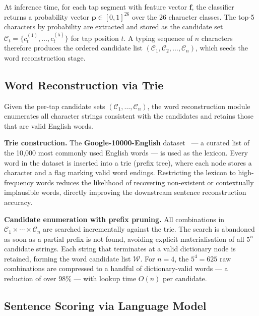 \documentclass[conference]{IEEEtran}
\begin{document}
At inference time, for each tap segment with feature vector
$\mathbf{f}$, the classifier returns a probability vector
$\mathbf{p} \in [0,1]^{26}$ over the 26 character classes.
The top-5 characters by probability are extracted and stored as the
candidate set $\mathcal{C}_t = \{c_t^{(1)}, \ldots, c_t^{(5)}\}$
for tap position $t$.
A typing sequence of $n$ characters therefore produces the ordered
candidate list
$(\mathcal{C}_1, \mathcal{C}_2, \ldots, \mathcal{C}_n)$,
which seeds the word reconstruction stage.

\subsection{Word Reconstruction via Trie}

Given the per-tap candidate sets
$(\mathcal{C}_1, \ldots, \mathcal{C}_n)$, the word reconstruction
module enumerates all character strings consistent with the
candidates and retains those that are valid English words.

\textbf{Trie construction.}
The \textbf{Google-10000-English} dataset~\cite{google10k} --- a
curated list of the 10,000 most commonly used English words --- is
used as the lexicon.
Every word in the dataset is inserted into a trie (prefix tree),
where each node stores a character and a flag marking valid word
endings.
Restricting the lexicon to high-frequency words reduces the
likelihood of recovering non-existent or contextually implausible
words, directly improving the downstream sentence reconstruction
accuracy.

\textbf{Candidate enumeration with prefix pruning.}
All combinations in
$\mathcal{C}_1 \times \cdots \times \mathcal{C}_n$
are searched incrementally against the trie.
The search is abandoned as soon as a partial prefix is not found,
avoiding explicit materialisation of all $5^n$ candidate strings.
Each string that terminates at a valid dictionary node is retained,
forming the word candidate list $\mathcal{W}$.
For $n{=}4$, the $5^4{=}625$ raw combinations are compressed to a
handful of dictionary-valid words --- a reduction of over 98\% ---
with lookup time $O(n)$ per candidate.

\subsection{Sentence Scoring via Language Model}
\end{document}
